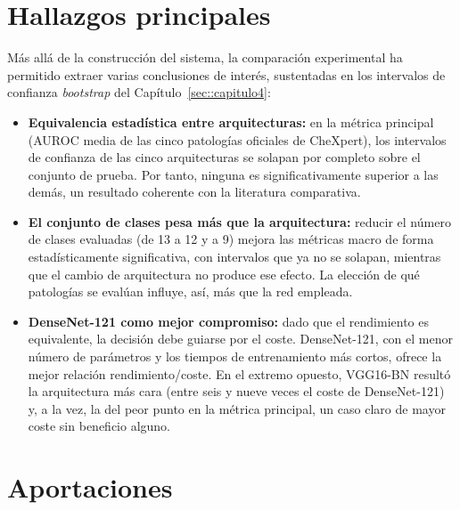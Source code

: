 \section{Hallazgos principales}
\label{sec::concl_hallazgos}

Más allá de la construcción del sistema, la comparación experimental ha permitido
extraer varias conclusiones de interés, sustentadas en los intervalos de confianza
\textit{bootstrap} del Capítulo~\ref{sec::capitulo4}:

\begin{itemize}
  \item \textbf{Equivalencia estadística entre arquitecturas:} en la métrica principal
        (AUROC media de las cinco patologías oficiales de CheXpert), los intervalos de
        confianza de las cinco arquitecturas se solapan por completo sobre el conjunto
        de prueba. Por tanto, ninguna es significativamente superior a las demás, un
        resultado coherente con la literatura comparativa.
  \item \textbf{El conjunto de clases pesa más que la arquitectura:} reducir el número
        de clases evaluadas (de 13 a 12 y a 9) mejora las métricas macro de forma
        estadísticamente significativa, con intervalos que ya no se solapan, mientras
        que el cambio de arquitectura no produce ese efecto. La elección de qué
        patologías se evalúan influye, así, más que la red empleada.
  \item \textbf{DenseNet-121 como mejor compromiso:} dado que el rendimiento es
        equivalente, la decisión debe guiarse por el coste. DenseNet-121, con el menor
        número de parámetros y los tiempos de entrenamiento más cortos, ofrece la mejor
        relación rendimiento/coste. En el extremo opuesto, VGG16-BN resultó la
        arquitectura más cara (entre seis y nueve veces el coste de DenseNet-121) y, a
        la vez, la del peor punto en la métrica principal, un caso claro de mayor coste
        sin beneficio alguno.
\end{itemize}

\section{Aportaciones}
\label{sec::concl_aportaciones}

